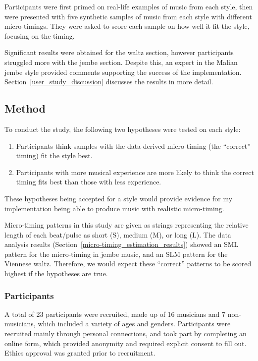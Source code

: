 \documentclass[12pt,twoside,openright]{report}
\begin{document}
Participants were first primed on real-life
examples of music from each style, then were presented with five synthetic
samples of music from each style with different micro-timings. They were asked
to score each sample on how well it fit the style, focusing on the timing.

Significant results were obtained for the waltz section, however participants
struggled more with the jembe section. Despite this, an expert in the Malian
jembe style provided comments supporting the success of the implementation. Section~\ref{user_study_discussion} discusses the results in more detail.


\subsection{Method} \label{user_study_method}

To conduct the study, the following two hypotheses were tested on each style:

\begin{enumerate}
    \item \label{hypothesis_1} Participants think samples with the data-derived micro-timing (the ``correct'' timing) fit the style best.
    \item \label{hypothesis_2} Participants with more musical experience are more likely to think the correct timing fits best than those with less experience.
\end{enumerate}

These hypotheses being accepted for a style would provide evidence for my
implementation being able to produce music with realistic micro-timing.

Micro-timing patterns in this study are given as strings representing the
relative length of each beat/pulse as short (S), medium (M), or long (L). The
data analysis results (Section~\ref{micro-timing_estimation_results}) showed an SML pattern for the micro-timing in
jembe music, and an SLM pattern for the Viennese waltz. Therefore, we would
expect these ``correct'' patterns to be scored highest if the hypotheses are
true.

\subsubsection{Participants} \label{participants}

A total of 23 participants were recruited, made up of 16 musicians and 7
non-musicians, which included a variety of ages and genders. Participants were
recruited mainly through personal connections, and took part by completing an
online form, which provided anonymity and required explicit consent to fill out.
Ethics approval was granted prior to recruitment.
\end{document}
